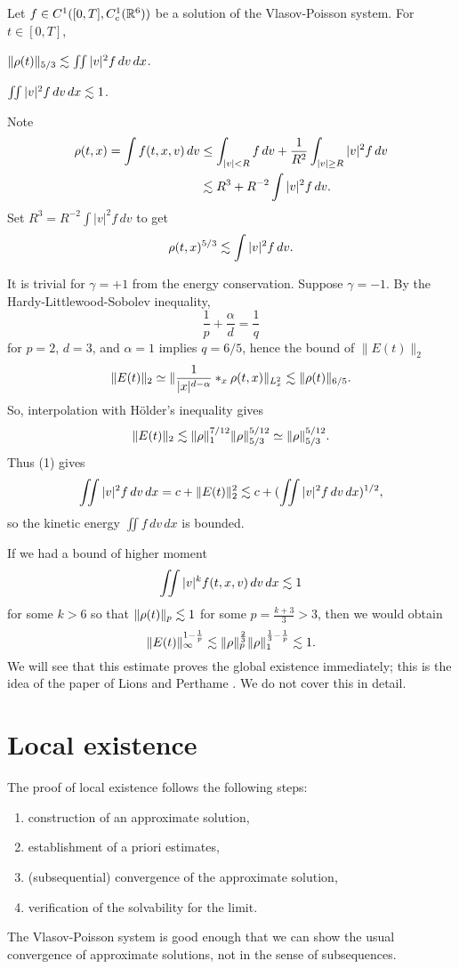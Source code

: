 \documentclass[11pt]{amsart}
\begin{document}
\begin{lem}
Let $f\in C^1([0,T],C_c^1(\mathbb{R}^6))$ be a solution of the Vlasov-Poisson system.
For $t\in[0,T]$,
\begin{cond}
\item $\|\rho(t)\|_{5/3}\lesssim\iint|v|^2f\,dv\,dx$.
\item $\iint|v|^2f\,dv\,dx\lesssim1$.
\end{cond}
\end{lem}
\begin{pfs}
\item
Note
\begin{align*}
\rho(t,x)=\int f(t,x,v)\,dv
&\le\int_{|v|<R}f\,dv+\frac1{R^2}\int_{|v|\ge R}|v|^2f\,dv\\
&\lesssim R^3+ R^{-2}\int|v|^2f\,dv.
\end{align*}
Set $R^3=R^{-2}\int|v|^2f\,dv$ to get
\[\rho(t,x)^{5/3}\lesssim\int|v|^2f\,dv.\]

\item
It is trivial for $\gamma=+1$ from the energy conservation.
Suppose $\gamma=-1$.
By the Hardy-Littlewood-Sobolev inequality,
\[\frac1p+\frac\alpha d=\frac1q\]
for $p=2$, $d=3$, and $\alpha=1$ implies $q=6/5$, hence the bound of $\|E(t)\|_2$
\[\|E(t)\|_2\simeq\|\frac1{|x|^{d-\alpha}}*_x\rho(t,x)\|_{L_x^2}\lesssim\|\rho(t)\|_{6/5}.\]
So, interpolation with H\"older's inequality gives
\[\|E(t)\|_2\lesssim\|\rho\|_1^{7/12}\|\rho\|_{5/3}^{5/12}\simeq\|\rho\|_{5/3}^{5/12}.\]
Thus (1) gives
\[\iint|v|^2f\,dv\,dx=c+\|E(t)\|_2^2\lesssim c+(\iint|v|^2f\,dv\,dx)^{1/2},\]
so the kinetic energy $\iint f\,dv\,dx$ is bounded.\qedhere
\end{pfs}

\begin{rmk}
If we had a bound of higher moment
\[\iint|v|^kf(t,x,v)\,dv\,dx\lesssim1\]
for some $k>6$ so that $\|\rho(t)\|_p\lesssim1$ for some $p=\frac{k+3}3>3$, then we would obtain
\[\|E(t)\|_\infty^{1-\frac1p}\lesssim\|\rho\|_p^{\frac23}\|\rho\|_1^{\frac13-\frac1p}\lesssim1.\]
We will see that this estimate proves the global existence immediately; this is the idea of the paper of Lions and Perthame \cite{lions1991propagation}.
We do not cover this in detail.
\end{rmk}




\section{Local existence}

The proof of local existence follows the following steps:
\begin{enumerate}
\item construction of an approximate solution,
\item establishment of a priori estimates,
\item (subsequential) convergence of the approximate solution,
\item verification of the solvability for the limit.
\end{enumerate}
The Vlasov-Poisson system is good enough that we can show the usual convergence of approximate solutions, not in the sense of subsequences.
\end{document}
